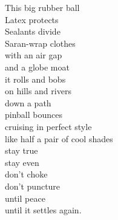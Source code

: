 This big rubber ball\\

Latex protects\\

Sealants divide\\

Saran-wrap clothes\\

with an air gap\\

and a globe moat\\

it rolls and bobs\\

on hills and rivers\\

down a path\\

pinball bounces\\

cruising in perfect style\\

like half a pair of cool shades\\

stay true\\

stay even\\

don't choke\\

don't puncture\\

until peace\\

until it settles again.\\




